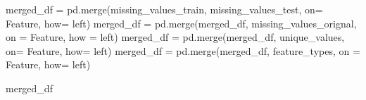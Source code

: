 \documentclass[
  letterpaper,
  DIV=11,
  numbers=noendperiod]{scrartcl}
\newenvironment{Shaded}{\begin{snugshade}}{\end{snugshade}}
\newcommand{\NormalTok}[1]{\textcolor[rgb]{0.00,0.23,0.31}{#1}}
\newcommand{\OperatorTok}[1]{\textcolor[rgb]{0.37,0.37,0.37}{#1}}
\newcommand{\StringTok}[1]{\textcolor[rgb]{0.13,0.47,0.30}{#1}}
\begin{document}
\begin{Shaded}
\begin{Highlighting}[]
\NormalTok{merged\_df }\OperatorTok{=}\NormalTok{ pd.merge(missing\_values\_train, missing\_values\_test, on}\OperatorTok{=} \StringTok{\textquotesingle{}Feature\textquotesingle{}}\NormalTok{, how}\OperatorTok{=} \StringTok{\textquotesingle{}left\textquotesingle{}}\NormalTok{)}
\NormalTok{merged\_df }\OperatorTok{=}\NormalTok{ pd.merge(merged\_df, missing\_values\_orignal, on }\OperatorTok{=} \StringTok{\textquotesingle{}Feature\textquotesingle{}}\NormalTok{, how }\OperatorTok{=} \StringTok{\textquotesingle{}left\textquotesingle{}}\NormalTok{)}
\NormalTok{merged\_df }\OperatorTok{=}\NormalTok{ pd.merge(merged\_df, unique\_values, on}\OperatorTok{=} \StringTok{\textquotesingle{}Feature\textquotesingle{}}\NormalTok{, how}\OperatorTok{=} \StringTok{\textquotesingle{}left\textquotesingle{}}\NormalTok{)}
\NormalTok{merged\_df }\OperatorTok{=}\NormalTok{ pd.merge(merged\_df, feature\_types, on }\OperatorTok{=} \StringTok{\textquotesingle{}Feature\textquotesingle{}}\NormalTok{, how}\OperatorTok{=} \StringTok{\textquotesingle{}left\textquotesingle{}}\NormalTok{)}

\NormalTok{merged\_df}
\end{Highlighting}
\end{Shaded}
\end{document}
